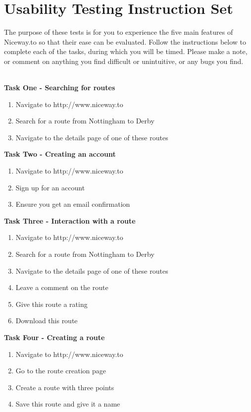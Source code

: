 \newpage
\section{Usability Testing Instruction Set}
\label{sec:utis}
The purpose of these tests is for you to experience the five main features of Niceway.to so that their ease can be evaluated. Follow the instructions below to complete each of the tasks, during which you will be timed. Please make a note, or comment on anything you find difficult or unintuitive, or any bugs you find.
\ \\
\ \\
\begin{Large}\noindent\textbf{Task One - Searching for routes}\end{Large}
\begin{enumerate}
	\item Navigate to http://www.niceway.to
	\item Search for a route from Nottingham to Derby
	\item Navigate to the details page of one of these routes
\end{enumerate}

\begin{Large}\noindent\textbf{Task Two - Creating an account}\end{Large}
\begin{enumerate}
	\item Navigate to http://www.niceway.to
	\item Sign up for an account 
	\item Ensure you get an email confirmation
\end{enumerate}

\begin{Large}\noindent\textbf{Task Three - Interaction with a route}\end{Large}
\begin{enumerate}
	\item Navigate to http://www.niceway.to
	\item Search for a route from Nottingham to Derby
	\item Navigate to the details page of one of these routes
	\item Leave a comment on the route
	\item Give this route a rating
	\item Download this route
\end{enumerate}

\begin{Large}\noindent\textbf{Task Four - Creating a route}\end{Large}
\begin{enumerate}
	\item Navigate to http://www.niceway.to
	\item Go to the route creation page
	\item Create a route with three points 
	\item Save this route and give it a name	
\end{enumerate}

